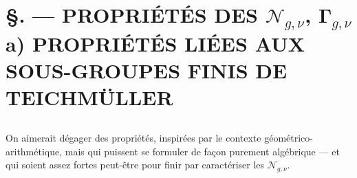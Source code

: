 

\chapter*{\S {}. --- PROPRIÉTÉS DES $\mathcal{N}_{g,\nu}$, $\boldsymbol{\Gamma}_{g,\nu}$ \\ a) PROPRIÉTÉS LIÉES AUX SOUS-GROUPES FINIS DE TEICHMÜLLER}\thispagestyle{empty}
\label{sec:30}
\section*{}

On aimerait dégager des propriétés, inspirées par le contexte géométrico-arithmétique, mais qui puissent se formuler de fa\c{c}on purement algébrique --- et qui soient assez fortes peut-être pour finir par caractériser les $\mathcal{N}_{g,\nu}$.  

